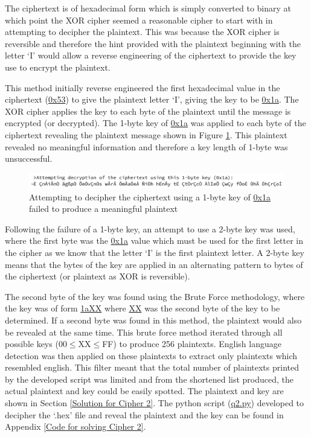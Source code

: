 \documentclass[a4paper,11pt]{article}
\begin{document}
	The ciphertext is of hexadecimal form which is simply converted to binary at which point the XOR cipher seemed a reasonable cipher to start with in attempting to decipher the plaintext. This was because the XOR cipher is reversible and therefore the hint provided with the plaintext beginning with the letter `I' would allow a reverse engineering of the ciphertext to provide the key use to encrypt the plaintext.
	
	This method initially reverse engineered the first hexadecimal value in the ciphertext (\url{0x53}) to give the plaintext letter `I', giving the key to be \url{0x1a}. The XOR cipher applies the key to each byte of the plaintext until the message is encrypted (or decrypted). The 1-byte key of \url{0x1a} was applied to each byte of the ciphertext revealing the plaintext message shown in Figure \ref{q2attempt}. This plaintext revealed no meaningful information and therefore a key length of 1-byte was unsuccessful.
	
		\begin{figure}[h]
			\centering
			\includegraphics[width = 16cm]{img/q2attempt}
			\captionsetup{width = 13cm}
			\caption{Attempting to decipher the ciphertext using a 1-byte key of \url{0x1a} failed to produce a meaningful plaintext}
			\label{q2attempt}
		\end{figure}	
	
	Following the failure of a 1-byte key, an attempt to use a 2-byte key was used, where the first byte was the \url{0x1a} value which must be used for the first letter in the cipher as we know that the letter `I' is the first plaintext letter. A 2-byte key means that the bytes of the key are applied in an alternating pattern to bytes of the ciphertext (or plaintext as XOR is reversible).  
	
	The second byte of the key was found using the Brute Force methodology, where the key was of form \url{1aXX} where \url{XX} was the second byte of the key to be determined. If a second byte was found in this method, the plaintext would also be revealed at the same time. This brute force method iterated through all possible keys (00$\leq$XX$\leq$FF) to produce 256 plaintexts. English language detection was then applied on these plaintexts to extract only plaintexts which resembled english. This filter meant that the total number of plaintexts printed by the developed script was limited and from the shortened list produced, the actual plaintext and key could be easily spotted. The plaintext and key are shown in Section \ref{Solution for Cipher 2}. The python script (\url{q2.py}) developed to decipher the `.hex' file and reveal the plaintext and the key can be found in Appendix \ref{Code for solving Cipher 2}.
	
\end{document}
